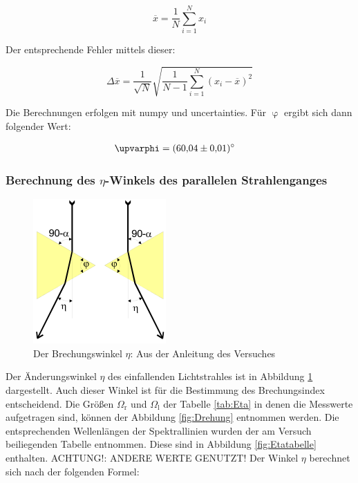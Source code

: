 \begin{equation}
  \label{eqn:mittelwert}
  \overline{x} = \frac{1}{N} \sum_{i=1}^N x_i
\end{equation}

Der entsprechende Fehler mittels dieser:

\begin{equation}
  \label{eqn:mittelwertfehler}
  \Delta \overline{x} = \frac{1}{\sqrt{N}} \sqrt{\frac{1}{N-1} \sum_{i=1}^N (x_i - \overline{x})^2}
\end{equation}

Die Berechnungen erfolgen mit numpy und uncertainties.
Für $\upvarphi$ ergibt sich dann folgender Wert:

\begin{align*}
  \upvarphi &= \SI{60.04 \pm 0.01}{\degree}
\end{align*}

\subsubsection{Berechnung des \texorpdfstring{$\eta$}{eta}-Winkels des parallelen Strahlenganges}

\begin{figure}
  \centering
  \includegraphics[scale=0.6]{images/Eta2.png}
  \caption{Der Brechungswinkel $\eta$: Aus der Anleitung des Versuches \cite[25]{1}}
  \label{fig:Eta2}
\end{figure}

Der Änderungswinkel $\eta$ des einfallenden Lichtstrahles ist in Abbildung \ref{fig:Eta2} dargestellt.
Auch dieser Winkel ist für die Bestimmung des Brechungsindex entscheidend.
Die Größen $\Omega_{\text{r}}$ und $\Omega_{\text{l}}$ der Tabelle \ref{tab:Eta} in denen die Messwerte aufgetragen sind, können der Abbildung \ref{fig:Drehung} entnommen werden.
Die entsprechenden Wellenlängen der Spektrallinien wurden der am Versuch beiliegenden Tabelle entnommen.
Diese sind in Abbildung \ref{fig:Etatabelle} enthalten. ACHTUNG!: ANDERE WERTE GENUTZT!
Der Winkel $\eta$ berechnet sich nach der folgenden Formel:

